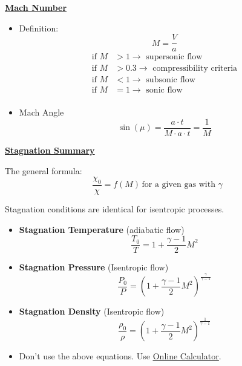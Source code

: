 \Large \textbf{\underline{\color{blue}Mach Number\color{black}}}

\begin{itemize}
    \item Definition:
    \begin{equation*}
        M = \frac{V}{a}
    \end{equation*}
    \begin{align*}
        \text{if } M &> 1 \to \text{ supersonic flow} \\
        \text{if } M &> 0.3 \to \text{ compressibility criteria} \\
        \text{if } M &< 1 \to \text{ subsonic flow} \\
        \text{if } M &= 1 \to \text{ sonic flow} \\
    \end{align*}
    \item Mach Angle
    \begin{equation*}
        \sin(\mu) = \frac{a\cdot t}{ M \cdot a \cdot t} = \frac{1}{M}
    \end{equation*}
\end{itemize}

\Large \textbf{\underline{\color{blue}Stagnation Summary\color{black}}}
\vspace{3mm}

The general formula:
\begin{equation*}
    \frac{\chi_0}{\chi} = f(M)\,\text{for a given gas with } \gamma
\end{equation*}

Stagnation conditions are identical for isentropic processes.

\begin{itemize}
    \item \textbf{Stagnation Temperature} \color{green}(adiabatic flow)\color{black}
    \begin{equation*}
        \frac{T_0}{T} = 1+ \frac{\gamma - 1}{2} M^2
    \end{equation*}
    \item \textbf{Stagnation Pressure} \color{green}(Isentropic flow) \color{black}
    \begin{equation*}
        \frac{P_0}{P} = \left(1+\frac{\gamma - 1}{2} M^2\right)^{\frac{\gamma}{\gamma-1}}
    \end{equation*}
    \item \textbf{Stagnation Density} \color{green}(Isentropic flow)\color{black}
    \begin{equation*}
        \frac{\rho_0}{\rho} = \left(1+\frac{\gamma-1}{2}M^2\right)^{\frac{1}{\gamma-1}}
    \end{equation*}
    \item Don't use the above equations. Use \href{http://www.dept.aoe.vt.edu/\~devenpor/aoe3114/calc.html}{\color{blue}\underline{Online Calculator}\color{black}}.
\end{itemize}

